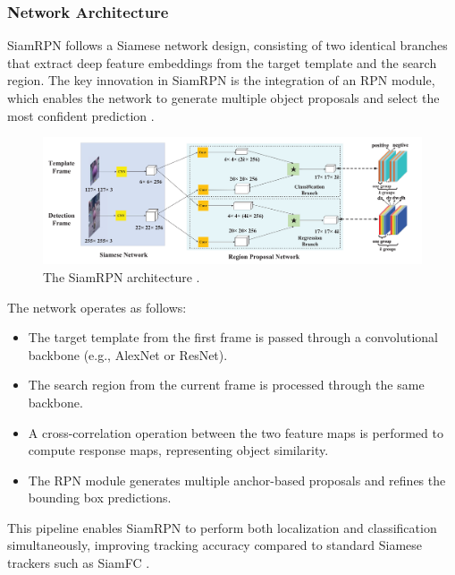 \subsubsection{Network Architecture}
SiamRPN follows a Siamese network design, consisting of two identical branches that extract deep feature embeddings from the target template and the search region. The key innovation in SiamRPN is the integration of an RPN module, which enables the network to generate multiple object proposals and select the most confident prediction \cite{li2018high}.

\begin{figure}[h]
    \centering
    \includegraphics[width=1\linewidth]{images/SiamRPN-architechture.png}
    \caption{The SiamRPN architecture \cite{li2018high}.}
    \label{fig:siamrpn_architecture}
\end{figure}

The network operates as follows:
\begin{itemize}
\item The target template from the first frame is passed through a convolutional backbone (e.g., AlexNet or ResNet).
\item The search region from the current frame is processed through the same backbone.
\item A cross-correlation operation between the two feature maps is performed to compute response maps, representing object similarity.
\item The RPN module generates multiple anchor-based proposals and refines the bounding box predictions.
\end{itemize}
This pipeline enables SiamRPN to perform both localization and classification simultaneously, improving tracking accuracy compared to standard Siamese trackers such as SiamFC \cite{bertinetto2016fully}.

